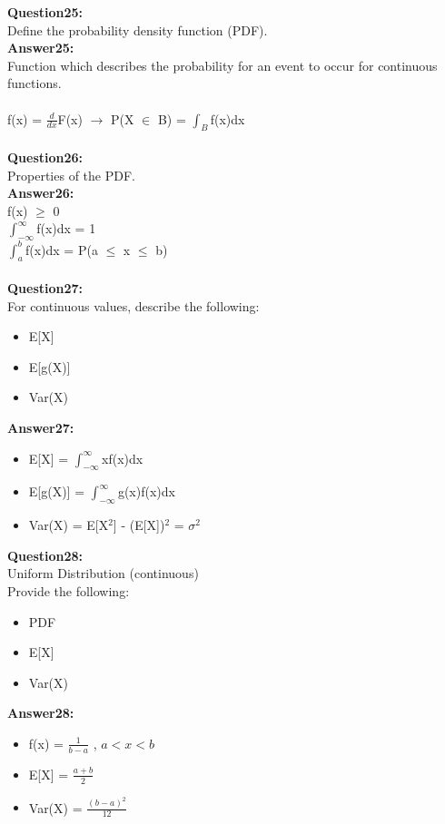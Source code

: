 \documentclass{article}
\begin{document}
\textbf{Question25:} \\
Define the probability density function (PDF).
\\
\textbf{Answer25:} \\
Function which describes the probability for an event to occur for continuous functions.
\\\\
f(x) = $\frac{d}{dx}$F(x) $\rightarrow$ P(X $\in$ B) = $\int_{B}$f(x)dx
\\\\


\textbf{Question26:} \\
Properties of the PDF.
\\
\textbf{Answer26:} \\
f(x) $\geq$ 0 \\
$\int_{-\infty}^{\infty}$f(x)dx = 1 \\
$\int_{a}^{b}$f(x)dx = P(a $\leq$ x $\leq$ b)
\\\\


\textbf{Question27:} \\
For continuous values, describe the following:\\
\begin{itemize}
	\item E[X]
	\item E[g(X)]
	\item Var(X)
\end{itemize}
\textbf{Answer27:} \\
\begin{itemize}
	\item E[X] = $\int_{-\infty}^{\infty}$xf(x)dx
	\item E[g(X)] = $\int_{-\infty}^{\infty}$g(x)f(x)dx
	\item Var(X) = E[X$^2$] - (E[X])$^2$ = $\sigma^2$
\end{itemize}


\textbf{Question28:} \\
Uniform Distribution (continuous)\\
Provide the following:
\begin{itemize}
	\item PDF
	\item E[X]
	\item Var(X)
\end{itemize}

\textbf{Answer28:} \\
\begin{itemize}
	\item f(x) = $\frac{1}{b - a}$ , $a < x < b$
	\item E[X] = $\frac{a + b}{2}$
	\item Var(X) = $\frac{(b - a)^2}{12}$
\end{itemize}
\end{document}
